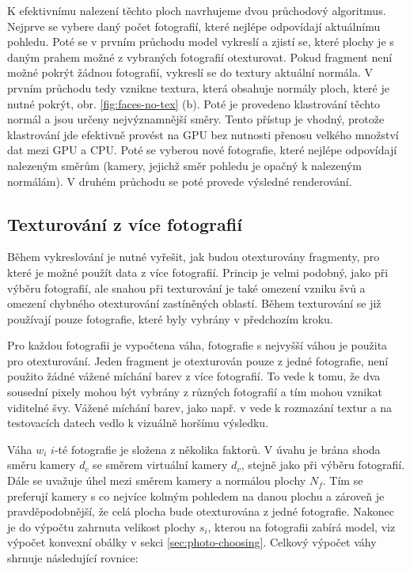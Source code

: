 \documentclass[11pt,twoside,a4paper]{book}
\begin{document}
K efektivnímu nalezení těchto ploch navrhujeme dvou průchodový algoritmus. Nejprve se vybere daný počet fotografií, které nejlépe odpovídají aktuálnímu pohledu. Poté se v prvním průchodu model vykreslí a zjistí se, které plochy je s daným prahem možné z vybraných fotografií otexturovat. Pokud fragment není možné pokrýt žádnou fotografií, vykreslí se do textury aktuální normála. V prvním průchodu tedy vznikne textura, která obsahuje normály ploch, které je nutné pokrýt, obr. \ref{fig:faces-no-tex} (b). Poté je provedeno klastrování těchto normál a jsou určeny nejvýznamnější směry. Tento přístup je vhodný, protože klastrování jde efektivně provést na GPU bez nutnosti přenosu velkého množství dat mezi GPU a CPU. Poté se vyberou nové fotografie, které nejlépe odpovídají nalezeným směrům (kamery, jejichž směr pohledu je opačný k nalezeným normálám). V druhém průchodu se poté provede výsledné renderování. 

\subsection{Texturování z více fotografií}
\label{sec:fragment-texturing}
Během vykreslování je nutné vyřešit, jak budou otexturovány fragmenty, pro které je možné použít data z více fotografií. Princip je velmi podobný, jako při výběru fotografií, ale snahou při texturování je také omezení vzniku švů a omezení chybného otexturování zastíněných oblastí. Během texturování se již používají pouze fotografie, které byly vybrány v předchozím kroku.

Pro každou fotografii je vypočtena váha, fotografie s nejvyšší váhou je použita pro otexturování. Jeden fragment je otexturován pouze z jedné fotografie, není použito žádné vážené míchání barev z více fotografií. To vede k tomu, že dva sousední pixely mohou být vybrány z různých fotografií a tím mohou vznikat viditelné švy. Vážené míchání barev, jako např. v \cite{Debevec96} vede k rozmazání textur a na testovacích datech vedlo k vizuálně horšímu výsledku. 

Váha $w_i$ $i$-té fotografie je složena z několika faktorů. V úvahu je brána shoda směru kamery $d_c$ se směrem virtuální kamery $d_v$, stejně jako při výběru fotografií. Dále se uvažuje úhel mezi směrem kamery a normálou plochy $N_f$. Tím se preferují kamery s co nejvíce kolmým pohledem na danou plochu a zároveň je pravděpodobnější, že celá plocha bude otexturována z jedné fotografie. Nakonec je do výpočtu zahrnuta  velikost plochy $s_i$, kterou na fotografii zabírá model, viz výpočet konvexní obálky v sekci \ref{sec:photo-choosing}. Celkový výpočet váhy shrnuje následující rovnice:
\end{document}
